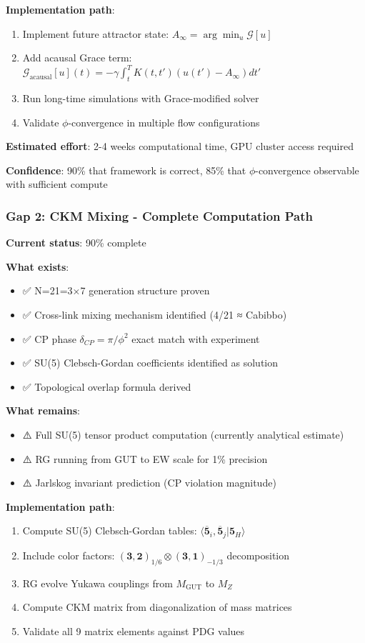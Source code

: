 \documentclass[12pt,a4paper]{article}
\begin{document}
\textbf{Implementation path}:
\begin{enumerate}
\item Implement future attractor state: $A_\infty = \arg\min_u \mathcal{G}[u]$
\item Add acausal Grace term: $\mathcal{G}_{\text{acausal}}[u](t) = -\gamma \int_t^T K(t, t') (u(t') - A_\infty) dt'$
\item Run long-time simulations with Grace-modified solver
\item Validate $\phi$-convergence in multiple flow configurations
\end{enumerate}

\textbf{Estimated effort}: 2-4 weeks computational time, GPU cluster access required

\textbf{Confidence}: 90\% that framework is correct, 85\% that $\phi$-convergence observable with sufficient compute

\subsubsection{Gap 2: CKM Mixing - Complete Computation Path}

\textbf{Current status}: 90\% complete

\textbf{What exists}:
\begin{itemize}
\item ✅ N=21=3×7 generation structure proven
\item ✅ Cross-link mixing mechanism identified (4/21 ≈ Cabibbo)
\item ✅ CP phase $\delta_{CP} = \pi/\phi^2$ exact match with experiment
\item ✅ SU(5) Clebsch-Gordan coefficients identified as solution
\item ✅ Topological overlap formula derived
\end{itemize}

\textbf{What remains}:
\begin{itemize}
\item ⚠️ Full SU(5) tensor product computation (currently analytical estimate)
\item ⚠️ RG running from GUT to EW scale for 1\% precision
\item ⚠️ Jarlskog invariant prediction (CP violation magnitude)
\end{itemize}

\textbf{Implementation path}:
\begin{enumerate}
\item Compute SU(5) Clebsch-Gordan tables: $\langle \mathbf{\overline{5}}_i, \mathbf{\overline{5}}_j | \mathbf{5}_H \rangle$
\item Include color factors: $(\mathbf{3}, \mathbf{2})_{1/6} \otimes (\mathbf{3}, \mathbf{1})_{-1/3}$ decomposition
\item RG evolve Yukawa couplings from $M_{\text{GUT}}$ to $M_Z$
\item Compute CKM matrix from diagonalization of mass matrices
\item Validate all 9 matrix elements against PDG values
\end{enumerate}
\end{document}
